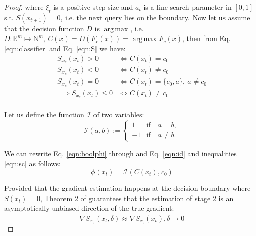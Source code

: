 \begin{proof}
where $\xi_t$ is a positive step size and $a_t$ is a line search parameter in $[0,1]$ s.t. $S(x_{t+1}) = 0$, i.e. the next query lies on the boundary.
Now let us assume that the decision function $D$ is $\operatorname*{arg\,max}$, i.e. $D: \mathbb{R}^m \mapsto \mathbb{N}^m, \:C(x) = D(F_c(x)) = \operatorname*{arg\,max} F_c(x)$, then from Eq. \ref{eqn:classifier} and Eq. \ref{eqn:S} we have:
\begin{equation}
\begin{aligned}
    S_{x_c}(x_t) > 0 & \iff C(x_t) = c_0\\
    S_{x_c}(x_t) < 0 & \iff C(x_t) \neq c_0\\
    S_{x_c}(x_t) = 0 & \iff C(x_t) = \{c_0,a\},\:a\neq c_0\\
    \implies S_{x_c}(x_t) \leq 0 & \iff C(x_t) \neq c_0\\
\end{aligned}
\label{eqn:sc}
\end{equation}

Let us define the function $\mathcal{I}$ of two variables:
\begin{equation}
    \mathcal{I}(a,b) :=
    \begin{cases}
    1 & \text{if} \quad a = b,\\
    -1 & \text{if} \quad a \neq b.
    \end{cases}
\label{eqn:id}
\end{equation}

We can rewrite Eq. \ref{eqn:boolphi} through and Eq. \ref{eqn:id} and inequalities \ref{eqn:sc} as follows: 
\begin{equation}
    \phi(x_t) = \mathcal{I}(C(x_t), c_0)
\label{eqn:phi}
\end{equation}

Provided that the gradient estimation happens at the decision boundary where $S(x_t) = 0$, Theorem 2 of \cite{chen2020hopskipjumpattack} guarantees that the estimation of stage 2 is an asymptotically unbiased direction of the true gradient:
\begin{equation}
  \widetilde{\nabla S_{x_c}}(x_t,\delta) \approx \nabla S_{x_c}(x_t), \delta \rightarrow 0
\label{eqn:approx}
\end{equation}


\end{proof}
